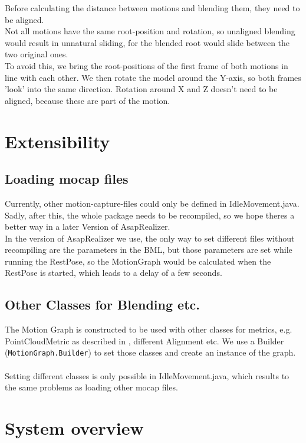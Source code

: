 \documentclass[a4paper,10pt,titlepage,bibliography=totocnumbered]{scrartcl}
\begin{document}
Before calculating the distance between motions and blending them, they need to be aligned.
\\
Not all motions have the same root-position and rotation, so unaligned blending would result in unnatural sliding, for the blended root would slide between the two original ones.
\\
To avoid this, we bring the root-positions of the first frame of both motions in line with each other. We then rotate the model around the Y-axis, so both frames 'look' into the same direction. Rotation around X and Z doesn't need to be aligned, because these are part of the motion.

\section{Extensibility}

\subsection{Loading mocap files}

Currently, other motion-capture-files could only be defined in IdleMovement.java. Sadly, after this, the whole package needs to be recompiled, so we hope theres a better way in a later Version of AsapRealizer.\\
In the version of AsapRealizer we use, the only way to set different files without recompiling are the parameters in the BML, but those parameters are set while running the RestPose, so the MotionGraph would be calculated when the RestPose is started, which leads to a delay of a few seconds.

\subsection{Other Classes for Blending etc.}

The Motion Graph is constructed to be used with other classes for metrics, e.g. PointCloudMetric as described in \cite{vanbasten2009}, different Alignment etc.
We use a Builder (\lstinline{MotionGraph.Builder}) to set those classes and create an instance of the graph.
\\\\
Setting different classes is only possible in IdleMovement.java, which results to the same problems as loading other mocap files.


\section{System overview}
\end{document}
